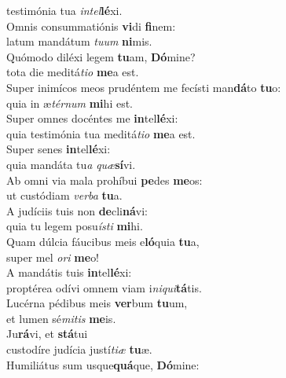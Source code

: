 \oddverse testimónia tua \textit{in}\textit{tel}\textbf{lé}xi.\\
\evenverse Omnis consummatiónis \textbf{vi}di \textbf{fi}nem:~\*\\
\evenverse latum mandátum \textit{tu}\textit{um} \textbf{ni}mis.\\
\oddverse Quómodo diléxi legem \textbf{tu}am, \textbf{Dó}mine?~\*\\
\oddverse tota die meditá\textit{ti}\textit{o} \textbf{me}a est.\\
\evenverse Super inimícos meos prudéntem me fecísti man\textbf{dá}to \textbf{tu}o:~\*\\
\evenverse quia in æ\textit{tér}\textit{num} \textbf{mi}hi est.\\
\oddverse Super omnes docéntes me \textbf{in}tel\textbf{lé}xi:~\*\\
\oddverse quia testimónia tua meditá\textit{ti}\textit{o} \textbf{me}a est.\\
\evenverse Super senes \textbf{in}tel\textbf{lé}xi:~\*\\
\evenverse quia mandáta tu\textit{a} \textit{quæ}\textbf{sí}vi.\\
\oddverse Ab omni via mala prohíbui \textbf{pe}des \textbf{me}os:~\*\\
\oddverse ut custódiam \textit{ver}\textit{ba} \textbf{tu}a.\\
\evenverse A judíciis tuis non \textbf{de}cli\textbf{ná}vi:~\*\\
\evenverse quia tu legem posu\textit{í}\textit{sti} \textbf{mi}hi.\\
\oddverse Quam dúlcia fáucibus meis e\textbf{ló}quia \textbf{tu}a,~\*\\
\oddverse super mel \textit{o}\textit{ri} \textbf{me}o!\\
\evenverse A mandátis tuis \textbf{in}tel\textbf{lé}xi:~\*\\
\evenverse proptérea odívi omnem viam i\textit{ni}\textit{qui}\textbf{tá}tis.\\
\oddverse Lucérna pédibus meis \textbf{ver}bum \textbf{tu}um,~\*\\
\oddverse et lumen sé\textit{mi}\textit{tis} \textbf{me}is.\\
\evenverse Ju\textbf{rá}vi, et \textbf{stá}tui~\*\\
\evenverse custodíre judícia justí\textit{ti}\textit{æ} \textbf{tu}æ.\\
\oddverse Humiliátus sum usque\textbf{quá}que, \textbf{Dó}mine:~\*\\
